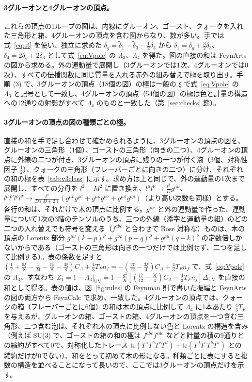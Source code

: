 \documentclass[a4paper,10pt]{ltjsarticle}
\newcommand{\DUV}{\Delta_{\mathrm{UV}}}
\newcommand{\tr}{\mathrm{tr}}
\begin{document}
\paragraph{3グルーオンと4グルーオンの頂点。}これらの頂点の1ループの図は、内線にグルーオン、ゴースト、クォークを入れた三角形と箱、4グルーオンの頂点を含む図からなり、数が多い。手では式~\eqref{eq:st} を使い、独立に求めた $\delta_g=\tilde\delta_1-\tilde\delta_3-\frac12\delta_3$ から $\delta_1=\delta_g+\frac32\delta_3$、$\delta_4=2\delta_g+2\delta_3$ として式~\eqref{eq:Vpole} の $\Lambda_3$、$\Lambda_4$ を得た。図の直接の和は FeynArts の図から求める。外の運動量で展開し（3グルーオンでは1次、4グルーオンでは0次）、すべての伝播関数に同じ質量を入れる赤外の組み替えで極を取り出す。手順 (3) で、3グルーオンの頂点（18個の図）の極は一般の $\xi$ で式~\eqref{eq:Vpole} の $\Lambda_3$ と記号として一致し、4グルーオンの頂点（54個の図）の極は色と計量の構造への12通りの射影がすべて $\Lambda_4$ のものと一致した（第~\ref{sec:checks} 節）。

\paragraph{3グルーオンの頂点の図の種類ごとの極。}直接の和を手で足し合わせて確かめられるように、3グルーオンの頂点の図を、グルーオンの三角形（1個）、ゴーストの三角形（向きの二つ）、4グルーオンの頂点に外線の二つが付き、3グルーオンの頂点に残りの一つが付く泡（3個、対称性因子 $\frac12$）、クォークの三角形（フレーバーごとに向きの二つ）に分け、それぞれの和の極を表~\ref{tab:v3class} に示す。求め方は上と同じで、外の運動量の1次まで展開し、すべての分母を $l^2-M^2$ に置き換え、$l^\mu l^\nu\to\frac{l^2}Dg^{\mu\nu}$、$l^\mu l^\nu l^\rho l^\sigma\to\frac{l^4}{D(D+2)}(g^{\mu\nu}g^{\rho\sigma}+g^{\mu\rho}g^{\nu\sigma}+g^{\mu\sigma}g^{\nu\rho})$（より高い次数も同様）とする。各行の和は、それだけで木の頂点に比例する。$g^{\mu\nu}$ と外の運動量で作った、運動量について1次の3階のテンソルのうち、三つの外線（添字と運動量の組）のどの二つの入れ替えでも符号を変える（$f^{abc}$ と合わせて Bose 対称な）ものは、木の頂点の Lorentz 部分 $g^{\mu\nu}(k-p)^\rho+g^{\nu\rho}(p-q)^\mu+g^{\rho\mu}(q-k)^\nu$ の定数倍しかないからである（ゴーストの三角形は向きの一つだけでは比例せず、二つを足して比例する）。表の係数を足すと $(\frac12+\frac{9\xi}8-\frac1{24}-\frac{15}8-\frac{3\xi}8)C_A+\frac43T_Fn_f=-(\frac{17}{12}-\frac{3\xi}4)C_A+\frac43T_Fn_f$ で、式~\eqref{eq:Vpole} の $\Lambda_3$、すなわち $Z_1=1-\Lambda_3|_{\mathrm{UV}}=1+\frac{g^2}K[(\frac{17}{12}-\frac{3\xi}4)C_A-\frac43T_Fn_f]\DUV$ を直接の和として得る。表の値は、図~\ref{fig:rules} の Feynman 則で書いた振幅と FeynArts の図の両方から FeynCalc で求め、一致した。4グルーオンの頂点では、クォークの箱（フレーバーごとに6個）の和は木の頂点に比例して $\Lambda_4$ に1本あたり $\frac43T_F$ を与えるが、グルーオンの箱、ゴーストの箱、4グルーオンの頂点を一つ含む三角形、二つ含む泡は、それぞれ木の頂点に比例しない色と Lorentz の構造を含み（例えば SU(3) で、ゴーストの箱の和の極は $f^{abe}f^{cde}$ などと計量の積の9通りとの縮約がすべて0で、対称化したトレース $\tr(T^aT^bT^cT^d)+\tr(T^dT^cT^bT^a)$ との縮約だけが0でない）、和をとって初めて木の形になる。種類ごとに表にすると複数の構造を並べることになって長いので、ここでは3グルーオンの頂点だけを示す。
\end{document}
